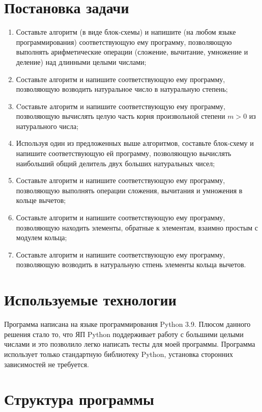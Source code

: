 \section{Постановка задачи}

\begin{enumerate}
    \item Составьте алгоритм (в виде блок-схемы) и напишите (на любом языке программирования) соответствующую ему программу, позволяющую выполнять арифметические операции (сложение, вычитание, умножение и деление) над длинными целыми числами;
    \item Составьте алгоритм и напишите соответствующую ему программу, позволяющую возводить натуральное число в натуральную степень;
    \item Cоставьте алгоритм и напишите соответствующую ему программу, позволяющую вычислять целую часть корня произвольной степени $m > 0$ из натурального числа;
    \item Используя один из предложенных выше алгоритмов, составьте блок-схему и напишите соответствующую ей программу, позволяющую вычислять наибольший общий делитель двух больших натуральных чисел;
    \item Составьте алгоритм и напишите соответствующую ему программу, позволяющую выполнять операции сложения, вычитания и умножения в кольце вычетов;
    \item Составьте алгоритм и напишите соответствующую ему программу, позволяющую находить элементы, обратные к элементам, взаимно простым с модулем кольца;
    \item Составьте алгоритм и напишите соответствующую ему программу, позволяющую возводить в натуральную стпень элементы кольца вычетов.
\end{enumerate}

\clearpage

\section{Используемые технологии}

Программа написана на языке программирования Python 3.9. Плюсом данного решения стало то, что ЯП Python
поддерживает работу с большими целыми числами и это позволило легко написать тесты для моей
программы. Программа использует только стандартную библиотеку Python, установка сторонних зависимостей
не требуется.

\clearpage

\section{Структура программы}

